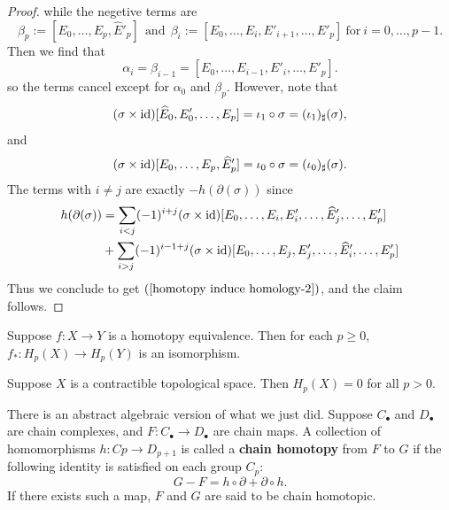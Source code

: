 \begin{proof}
while the negetive terms are
\[\beta_p:=[E_0,\dots,E_p,\widehat{E}'_p]\ \ \text{and}\ \ \beta_i:=[E_0,\dots,E_{i},E'_{i+1},\dots,E'_p]\ \text{for}\ i=0,\dots,p-1.\]
Then we find that 
\[\alpha_i=\beta_{i-1}=[E_0,\dots,E_{i-1},E'_{i},\dots,E'_p].\]
so the terms cancel except for $\alpha_0$ and $\beta_p$. However, note that 
\[(\sigma\times\mathrm{id})[\widehat{E}_0,E'_0,\dots,E_p]=\iota_1\circ\sigma=(\iota_1)_\sharp(\sigma),\]
and 
\[(\sigma\times\mathrm{id})[E_0,\dots,E_p,\widehat{E}'_p]=\iota_0\circ\sigma=(\iota_0)_\sharp(\sigma).\]
The terms with $i\neq j$ are exactly $-h(\partial(\sigma))$ since
\begin{align*}
h(\partial(\sigma))&=\sum_{i<j}(-1)^{i+j}(\sigma\times\mathrm{id})[E_0,\dots,E_i,E'_i,\dots,\widehat{E}'_j,\dots,E'_p]\\
&+\sum_{i>j}(-1)^{i-1+j}(\sigma\times\mathrm{id})[E_0,\dots,E_j,E'_j,\dots,\widehat{E}'_i,\dots,E'_p]
\end{align*}
Thus we conclude to get $(\ref{homotopy induce homology-2})$, and the claim follows.
\end{proof}
\begin{corollary}
Suppose $f:X\to Y$ is a homotopy equivalence. Then for each $p\geq0$, $f_*:H_p(X)\to H_p(Y)$ is an isomorphism.
\end{corollary}
\begin{corollary}\label{homology comtractible}
Suppose $X$ is a contractible topological space. Then $H_p(X)=0$ for all $p>0$.
\end{corollary}
There is an abstract algebraic version of what we just did. Suppose $C_\bullet$ and $D_\bullet$ are chain complexes, and $F:C_\bullet\to D_\bullet$ are chain maps. A collection of homomorphisms $h:Cp\to D_{p+1}$ is called a \textbf{chain homotopy} from $F$ to $G$ if the following identity is satisfied on each group $C_p$:
\[G-F=h\circ\partial+\partial\circ h.\]
If there exists such a map, $F$ and $G$ are said to be chain homotopic.
